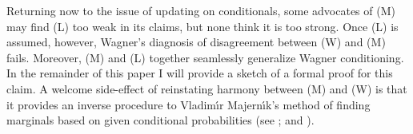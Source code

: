 \documentclass[11pt]{article}
\begin{document}





Returning now to the issue of updating on conditionals, some advocates
of (M) may find (L) too weak in its claims, but none think it is too
strong. Once (L) is assumed, however, Wagner's diagnosis of
disagreement between (W) and (M) fails. Moreover, (M) and (L) together
seamlessly generalize Wagner conditioning. In the remainder of this
paper I will provide a sketch of a formal proof for this claim. A
welcome side-effect of reinstating harmony between (M) and (W) is that
it provides an inverse procedure to Vladim{\'\i}r Majern{\'\i}k's
method of finding marginals based on given conditional probabilities
(see ; and ).
\end{document}
